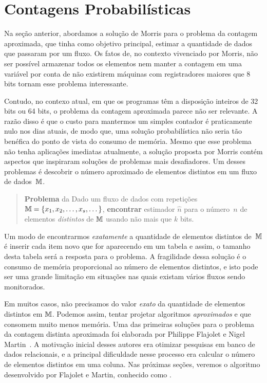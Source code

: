 \chapter{Contagens Probabilísticas}
\label{lab:flajolet-martin}

Na seção anterior, abordamos a solução de Morris para o problema da contagem aproximada, que tinha como objetivo 
principal, estimar a quantidade de dados que passaram por um fluxo. Os fatos de, no contexto vivenciado por Morris, não 
ser possível armazenar todos os elementos nem manter a contagem em uma variável por conta de não existirem máquinas com 
registradores maiores que 8 bits tornam esse problema interessante.

Contudo, no contexo atual, em que os programas têm a disposição inteiros de 32 bits ou 64 bits, o problema da contagem
aproximada parece não ser relevante. A razão disso é que o custo para mantermos um simples contador é praticamente nulo 
nos dias atuais, de modo que, uma solução probabilística não seria tão benéfica do ponto de vista do consumo de memória.
Mesmo que esse problema não tenha aplicações imediatas atualmente, a solução proposta por Morris contém aspectos que 
inspiraram soluções de problemas mais desafiadores. Um desses problemas é descobrir o número aproximado de elementos 
distintos em um fluxo de dados~$\mathbb{M}$. 

\begin{quote}
  \textbf{Problema} da  Dado um fluxo de dados com repetições
  $\mathbb{M} = \{ x_1, x_2, \dots, x_s, \dots \}$, \textbf{encontrar} estimador $\hat{n}$ para o número~$n$ de elementos 
  \textit{distintos} de $\mathbb{M}$ usando não mais que $k$ bits.
\end{quote}

Um modo de encontrarmos \textit{exatamente} a quantidade de elementos distintos de~$\mathbb{M}$ é inserir cada item novo que 
for aparecendo em um tabela e assim, o tamanho desta tabela será a resposta para o problema. A fragilidade dessa solução 
é o consumo de memória proporcional ao número de elementos distintos, e isto pode ser uma grande limitação em situações 
nas quais existam vários fluxos sendo monitorados. 

Em muitos casos, não precisamos do valor \textit{exato} da quantidade de elementos distintos em $\mathbb{M}$. Podemos assim, 
tentar projetar algoritmos \textit{aproximados} e que consomem muito menos memória. Uma das primeiras soluções para o 
problema da contagem distinta aproximada foi elaborada por Philippe Flajolet e Nigel Martin~\citep{flajolet:martin:85}. 
A motivação inicial desses autores era otimizar pesquisas em banco de dados relacionais, e a principal dificuldade nesse 
processo era calcular o número de elementos distintos em uma coluna. Nas próximas seções, veremos o algoritmo 
desenvolvido por Flajolet e Martin, conhecido como .

